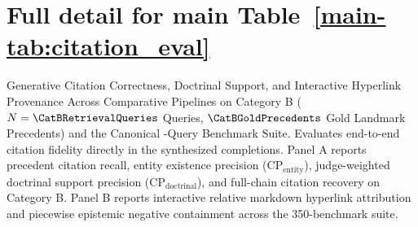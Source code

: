 \clearpage
\section{Full detail for main Table~\ref{main-tab:citation_eval}}
\label{detail-tab:citation_eval}
Generative Citation Correctness, Doctrinal Support, and Interactive Hyperlink Provenance Across Comparative Pipelines on Category B ($N=\CatBRetrievalQueries$ Queries, $\CatBGoldPrecedents$ Gold Landmark Precedents) and the Canonical \numUniqueQueries-Query Benchmark Suite. Evaluates end-to-end citation fidelity directly in the synthesized completions. Panel A reports precedent citation recall, entity existence precision ($\text{CP}_{\text{entity}}$), judge-weighted doctrinal support precision ($\text{CP}_{\text{doctrinal}}$), and full-chain citation recovery on Category B. Panel B reports interactive relative markdown hyperlink attribution and piecewise epistemic negative containment across the 350-benchmark suite.\par\medskip
